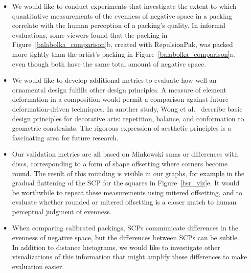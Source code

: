 \begin{itemize}

\item We would like to conduct experiments that investigate the
  extent to which quantitative measurements of the evenness of negative
  space in a packing correlate with the human perception of a
  packing's quality.  In informal evaluations, some viewers found that
  the packing in Figure~\ref{balabolka_comparison}b, created with RepulsionPak,
  was packed more tightly than the artist's packing in
  Figure~\ref{balabolka_comparison}a, even though both have the same total
  amount of negative space.


\item We would like to develop additional metrics to evaluate
  how well an ornamental design fulfills other design principles.
  A measure of element deformation in a composition would permit 
  a comparison against future deformation-driven techniques.
  In another study, Wong et al.~\cite{Wong1998} describe basic design
  principles for decorative arts: repetition, balance, and conformation
  to geometric constraints.  The rigorous expression of aesthetic principles
  is a fascinating area for future research.

\item Our validation metrics are all based on Minkowski sums or
  differences with discs, corresponding to a form of shape offsetting
  where corners become round.  The result of this rounding is visible in
  our graphs, for example in the gradual flattening of the SCP for
  the squares in Figure~\ref{hsr_viz}e.  It would be worthwhile to repeat
  these measurements using mitered offsetting, and to evaluate whether
  rounded or mitered offsetting is a closer match to human perceptual
  judgment of evenness.

\item When comparing calibrated packings, SCPs communicate 
  differences in the evenness of negative space, but the differences 
  between SCPs can be subtle.  In addition to distance histograms, 
  we would like to investigate other visualizations of this information
  that might amplify these differences to make evaluation easier.


\end{itemize}
